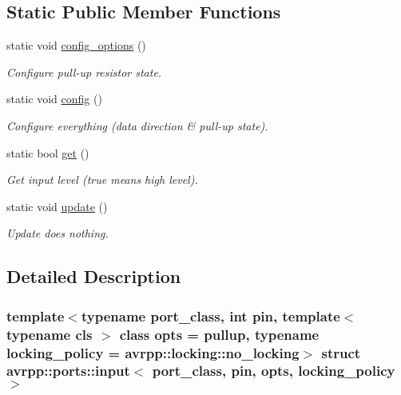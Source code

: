 \subsection*{Static Public Member Functions}
\begin{DoxyCompactItemize}
\item 
static void \hyperlink{structavrpp_1_1ports_1_1input_ab71c15488d0e848a282ef90a6e3ad7ad}{config\_\-options} ()
\begin{DoxyCompactList}\small\item\em Configure pull-\/up resistor state. \item\end{DoxyCompactList}\item 
static void \hyperlink{structavrpp_1_1ports_1_1input_a1fb7ad632124213a4c8303630ecef479}{config} ()
\begin{DoxyCompactList}\small\item\em Configure everything (data direction \& pull-\/up state). \item\end{DoxyCompactList}\item 
static bool \hyperlink{structavrpp_1_1ports_1_1input_ac9dac0dc25b8517b7e7a5a3a22789e53}{get} ()
\begin{DoxyCompactList}\small\item\em Get input level (true means high level). \item\end{DoxyCompactList}\item 
static void \hyperlink{structavrpp_1_1ports_1_1input_a521d6686b651f7ace67902817c817774}{update} ()
\begin{DoxyCompactList}\small\item\em Update does nothing. \item\end{DoxyCompactList}\end{DoxyCompactItemize}


\subsection{Detailed Description}
\subsubsection*{template$<$typename port\_\-class, int pin, template$<$ typename cls $>$ class opts = pullup, typename locking\_\-policy = avrpp::locking::no\_\-locking$>$ struct avrpp::ports::input$<$ port\_\-class, pin, opts, locking\_\-policy $>$}

